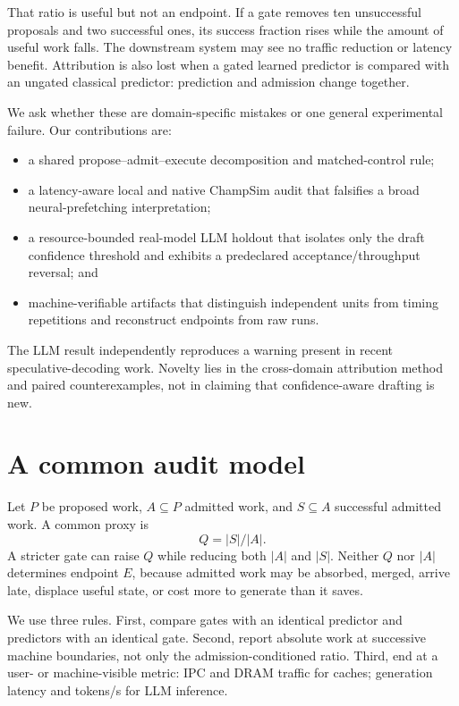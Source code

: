 \documentclass[conference]{IEEEtran}
\begin{document}
That ratio is useful but not an endpoint. If a gate removes ten unsuccessful
proposals and two successful ones, its success fraction rises while the amount
of useful work falls. The downstream system may see no traffic reduction or
latency benefit. Attribution is also lost when a gated learned predictor is
compared with an ungated classical predictor: prediction and admission change
together.

We ask whether these are domain-specific mistakes or one general experimental
failure. Our contributions are:
\begin{itemize}
\item a shared propose--admit--execute decomposition and matched-control rule;
\item a latency-aware local and native ChampSim audit that falsifies a broad
neural-prefetching interpretation;
\item a resource-bounded real-model LLM holdout that isolates only the draft
confidence threshold and exhibits a predeclared acceptance/throughput
reversal; and
\item machine-verifiable artifacts that distinguish independent units from
timing repetitions and reconstruct endpoints from raw runs.
\end{itemize}

The LLM result independently reproduces a warning present in recent
speculative-decoding work. Novelty lies in the cross-domain attribution method
and paired counterexamples, not in claiming that confidence-aware drafting is
new.

\section{A common audit model}
Let $P$ be proposed work, $A\subseteq P$ admitted work, and $S\subseteq A$
successful admitted work. A common proxy is
\begin{equation}
Q=|S|/|A|.
\end{equation}
A stricter gate can raise $Q$ while reducing both $|A|$ and $|S|$. Neither
$Q$ nor $|A|$ determines endpoint $E$, because admitted work may be absorbed,
merged, arrive late, displace useful state, or cost more to generate than it
saves.

We use three rules. First, compare gates with an identical predictor and
predictors with an identical gate. Second, report absolute work at successive
machine boundaries, not only the admission-conditioned ratio. Third, end at a
user- or machine-visible metric: IPC and DRAM traffic for caches; generation
latency and tokens/s for LLM inference.
\end{document}
